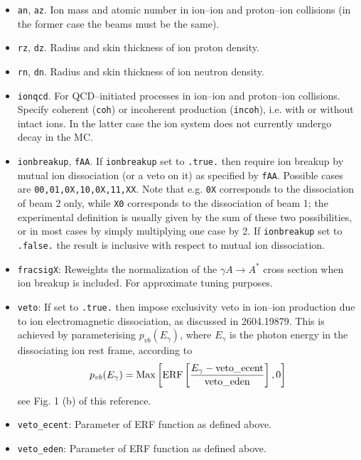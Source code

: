 \documentclass[12pt]{article}
\begin{document}
\begin{itemize}
event record it is also possible to only generate events where proton A (\texttt{sda}) or B (\texttt{sdb}) 
dissociates, with the sum of these two giving the total SD cross section.
\item \texttt{an}, \texttt{az}. Ion mass and atomic number in ion--ion and proton--ion collisions (in the former 
case the beams must be the same).
\item \texttt{rz}, \texttt{dz}. Radius and skin thickness of ion proton density.
\item \texttt{rn}, \texttt{dn}. Radius and skin thickness of ion neutron density.
\item \texttt{ionqcd}. For QCD--initiated processes in ion--ion and proton--ion collisions. Specify coherent 
(\texttt{coh}) or incoherent production (\texttt{incoh}), i.e. with or without intact ions. In the latter case the 
ion system does not currently undergo decay in the MC.
\item \texttt{ionbreakup}, \texttt{fAA}. If \texttt{ionbreakup} set to \texttt{.true.} then require ion breakup by 
mutual ion dissociation (or a veto on it) as specified by \texttt{fAA}. Possible cases are \texttt{00,01,0X,10,0X,11,XX}.
 Note that e.g. \texttt{0X} corresponds to the dissociation of beam 2 only, while \texttt{X0} corresponds to the 
 dissociation of beam 1; the experimental definition is usually given by the sum of these two possibilities, or in 
 most cases by simply multiplying one case by 2. If \texttt{ionbreakup} set to \texttt{.false.} the result is 
 inclusive with respect to mutual ion dissociation.
\item \texttt{fracsigX}: Reweights the normalization of the $\gamma A \to A^*$ cross section when ion breakup is 
included. For approximate tuning purposes.
\item \texttt{veto}: If set to \texttt{.true.} then impose exclusivity veto in ion--ion production due to ion electromagnetic dissociation, as discussed in 2604.19879.
This is achieved by parameterising $p_{vb}(E_\gamma)$, where $E_\gamma$ is the photon energy in the dissociating ion rest frame, according to
\begin{equation}
  p_{vb}(E_\gamma) = {\rm Max}\left[{\rm ERF} \left[ \frac{E_\gamma - {\rm veto\_ecent}}{{\rm veto\_eden}} \right],0\right]
\end{equation}
see Fig. 1 (b) of this reference.
\item \texttt{veto\_ecent}: Parameter of ERF function as defined above.
\item \texttt{veto\_eden}: Parameter of ERF function as defined above.

\end{itemize}
\end{document}
